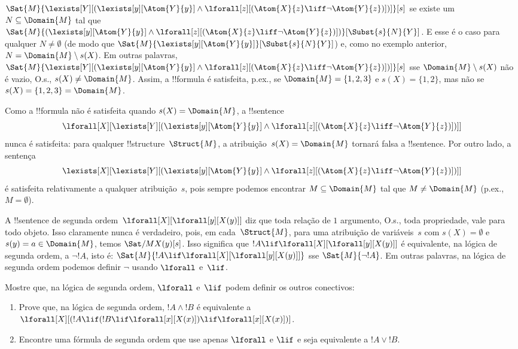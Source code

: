 \documentclass[../../../include/open-logic-section]{subfiles}
\begin{document}
\begin{ex}
  $\Sat{M}{\lexists[Y][(\lexists[y][\Atom{Y}{y}] \land
  \lforall[z][(\Atom{X}{z} \liff \lnot \Atom{Y}{z})])]}[s]$ se existe
  um $N \subseteq \Domain{M}$ tal que
  $\Sat{M}{(\lexists[y][\Atom{Y}{y}] \land \lforall[z][(\Atom{X}{z}
  \liff \lnot \Atom{Y}{z})])}[\Subst{s}{N}{Y}]$. E esse é o caso para
  qualquer $N \neq \emptyset$ (de modo que
  $\Sat{M}{\lexists[y][\Atom{Y}{y}]}[\Subst{s}{N}{Y}]$) e, como no exemplo
  anterior, $N = \Domain{M} \setminus s(X)$. Em outras palavras,
  $\Sat{M}{\lexists[Y][(\lexists[y][\Atom{Y}{y}] \land
  \lforall[z][(\Atom{X}{z} \liff \lnot \Atom{Y}{z})])]}[s]$ sse
  $\Domain{M} \setminus s(X)$ não é vazio, O.s.\@, $s(X) \neq
  \Domain{M}$. Assim, a !!{formula} é satisfeita, p.ex., se
  $\Domain{M} = \{1, 2, 3\}$ e $s(X) = \{1, 2\}$, mas não se
  $s(X) = \{1, 2, 3\} = \Domain{M}$.

  Como a !!{formula} não é satisfeita quando $s(X) = \Domain{M}$, a
  !!{sentence}
  \[
  \lforall[X][\lexists[Y][(\lexists[y][\Atom{Y}{y}] \land
      \lforall[z][(\Atom{X}{z} \liff \lnot \Atom{Y}{z})])]]
  \]
  nunca é satisfeita: para qualquer !!{structure}~$\Struct{M}$, a
  atribuição~$s(X) = \Domain{M}$ tornará falsa a !!{sentence}. Por outro
  lado, a sentença
  \[
  \lexists[X][\lexists[Y][(\lexists[y][\Atom{Y}{y}] \land
      \lforall[z][(\Atom{X}{z} \liff \lnot \Atom{Y}{z})])]]
  \]
  é satisfeita relativamente a qualquer atribuição~$s$, pois sempre podemos
  encontrar $M \subseteq \Domain{M}$ tal que $M \neq \Domain{M}$ (p.ex., $M = \emptyset$).
\end{ex}

\begin{ex}
  A !!{sentence} de segunda ordem~$\lforall[X][\lforall[y][X(y)]]$ diz que
  toda relação de $1$ argumento, O.s.\@, toda propriedade, vale para todo objeto. Isso
  claramente nunca é verdadeiro, pois, em cada~$\Struct{M}$, para uma
  atribuição de variáveis~$s$ com $s(X) = \emptyset$ e
  $s(y) = a \in \Domain{M}$, temos $\Sat/{M}{X(y)}[s]$. Isso significa que
  $!A \lif \lforall[X][\lforall[y][X(y)]]$ é equivalente, na lógica de
  segunda ordem, a $\lnot !A$, isto é: $\Sat{M}{!A \lif
  \lforall[X][\lforall[y][X(y)]]}$ sse $\Sat{M}{\lnot !A}$. Em outras
  palavras, na lógica de segunda ordem podemos definir $\lnot$ usando
  $\lforall$ e~$\lif$.
\end{ex}

\begin{prob}
  Mostre que, na lógica de segunda ordem, $\lforall$ e~$\lif$ podem definir
  os outros conectivos:
  \begin{enumerate}
    \item Prove que, na lógica de segunda ordem, $!A \land !B$ é equivalente
    a $\lforall[X][(!A \lif (!B \lif \lforall[x][X(x)])\lif
    \lforall[x][X(x)])]$.
    \item Encontre uma fórmula de segunda ordem que use apenas $\lforall$ e
    $\lif$ e seja equivalente a $!A \lor !B$.
  \end{enumerate}
\end{prob}
\end{document}
